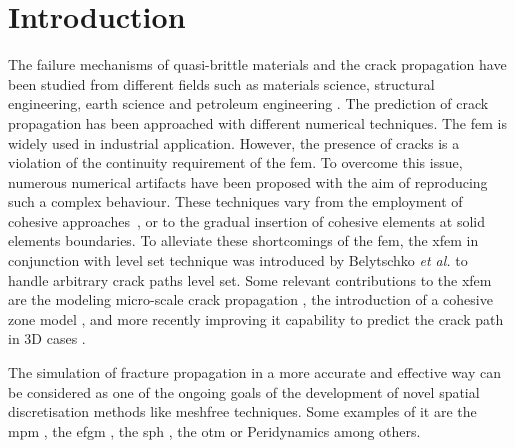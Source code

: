 \documentclass[preprint,12pt,a4paper]{elsarticle}
\begin{document}
\section{Introduction}
\label{sec:1}
The failure mechanisms of quasi-brittle materials and the  crack propagation have been studied from different fields such as materials science, structural engineering, earth science and petroleum engineering . The prediction of crack propagation has been approached with different numerical techniques. The \acrfull{fem} is widely used in industrial application. However, the presence of cracks is a violation of the continuity requirement of the \acrshort{fem}. To overcome this issue, numerous numerical
artifacts have been proposed with the aim of reproducing such a
complex behaviour. These techniques vary from the employment of cohesive
approaches~\cite{Barenblatt,Hilleborg_1976}, or to the gradual insertion of
cohesive elements \cite{Ortiz_1999,Pandolfi_2002,Ruiz_2000} at solid
elements boundaries. To alleviate these shortcomings of the
\acrshort{fem}, the \acrfull{xfem} in conjunction with level set
technique was introduced by Belytschko {\it et al.}
\cite{Belytschko_03} to handle arbitrary crack paths level
set. Some relevant contributions to the \acrshort{xfem} are the
modeling micro-scale crack propagation \cite{HUANG_2018}, the
introduction of a cohesive zone model \cite{NAGASHIMA_2016}, and more
recently improving it capability to predict the crack path in 3D cases
\cite{YUN_2019}.

The simulation of fracture propagation in a more accurate and effective
way can be considered as one of the ongoing goals of the development of novel spatial discretisation methods like meshfree techniques. Some
examples of it are the \acrfull{mpm}
\cite{Schreyer_2002,Chen_2002,Nairn_2003,Zhenmao_2005}, the
\acrfull{efgm} \cite{BELYTSCHKO_1995,BELYTSCHKO_2000,Zhuang_2012,Muthu_2013}, the
\acrfull{sph} \cite{Wang_2020,Wang_2019}, the \acrfull{otm} \cite{Li2010,Li_2012,Pandolfi_2013,Li_2015} or Peridynamics
\cite{HA_2011,RABCZUK_2017} among others. \\
\end{document}
